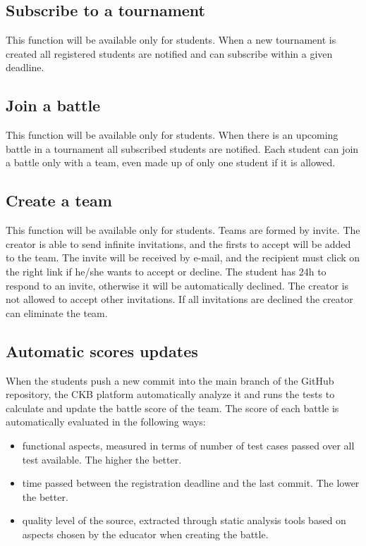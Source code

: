 \subsection{Subscribe to a tournament}
This function will be available only for students. \newline When a new tournament is created all registered students are notified and can subscribe within a given deadline.

\subsection{Join a battle}
This function will be available only for students. \newline When there is an upcoming battle in a tournament all subscribed students are notified. Each student can join a battle only with a team, even made up of only one student if it is allowed. 

\subsection{Create a team}
This function will be available only for students. \newline
Teams are formed by invite. The creator is able to send infinite invitations, and the firsts to accept will be added to the team.  \newline
The invite will be received by e-mail, and the recipient must click on the right link if he/she wants to accept or decline. The student has 24h to respond to an invite, otherwise it will be automatically declined. \newline
The creator is not allowed to accept other invitations. If all invitations are declined the creator can eliminate the team.

\subsection{Automatic scores updates}
When the students push a new commit into the main branch of the GitHub repository, the CKB platform automatically analyze it and runs the tests to calculate and update the battle score of the team.\newline
The score of each battle is automatically evaluated in the following ways:
\begin{itemize}
        \item functional aspects, measured in terms of number of test cases passed over all test available. The higher the better.
        \item time passed between the registration deadline and the last commit. The lower the better.
        \item quality level of the source, extracted through static analysis tools based on aspects chosen by the educator when creating the battle. 
\end{itemize}

